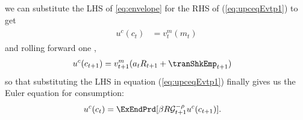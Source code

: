 \documentclass[titlepage, headings=optiontotocandhead]{econtex}
\begin{document}
we can substitute the LHS of \eqref{eq:envelope} for the RHS of
(\ref{eq:upceqEvtp1}) to get
  \begin{equation}\begin{gathered}\begin{aligned}
        u^{c}(c_{t})  & = {v}^{m}_{t}(m_{t})\label{eq:upcteqvtp}
      \end{aligned}\end{gathered}\end{equation}
and rolling forward one {\interval},
\begin{equation}\begin{gathered}\begin{aligned}
      u^{c}(c_{t+1})  & = v^{m}_{t+1}({a}_{t}R_{t+1}+\tranShkEmp_{t+1}) \label{eq:upctp1EqVpxtp1}
    \end{aligned}\end{gathered}\end{equation}
so that substituting the LHS in equation (\ref{eq:upceqEvtp1}) finally gives us the Euler equation for consumption:
  \begin{equation}\begin{gathered}\begin{aligned}
        u^{c}(c_{t})  & = \ExEndPrd[\beta R \mathcal{G}_{t+1}^{-\rho}u^{c}(c_{t+1})] \label{eq:cEuler}.
      \end{aligned}\end{gathered}\end{equation}

\end{document}
